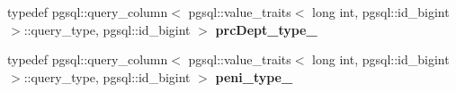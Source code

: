 \begin{DoxyCompactItemize}
\item 
typedef pgsql\+::query\+\_\+column$<$ pgsql\+::value\+\_\+traits$<$ long int, pgsql\+::id\+\_\+bigint $>$\+::query\+\_\+type, pgsql\+::id\+\_\+bigint $>$ {\bfseries prc\+Dept\+\_\+type\+\_\+}\hypertarget{structodb_1_1query__columns_3_01_1_1kpk_1_1data_1_1_loan_oper_00_01id__pgsql_00_01_a_01_4_1_1fact__class___a14ed1fbe0297b9c2cf99e91568973383}{}\label{structodb_1_1query__columns_3_01_1_1kpk_1_1data_1_1_loan_oper_00_01id__pgsql_00_01_a_01_4_1_1fact__class___a14ed1fbe0297b9c2cf99e91568973383}

\item 
typedef pgsql\+::query\+\_\+column$<$ pgsql\+::value\+\_\+traits$<$ long int, pgsql\+::id\+\_\+bigint $>$\+::query\+\_\+type, pgsql\+::id\+\_\+bigint $>$ {\bfseries peni\+\_\+type\+\_\+}\hypertarget{structodb_1_1query__columns_3_01_1_1kpk_1_1data_1_1_loan_oper_00_01id__pgsql_00_01_a_01_4_1_1fact__class___a73e43b8142ccdf0b2ed40fc949abddef}{}\label{structodb_1_1query__columns_3_01_1_1kpk_1_1data_1_1_loan_oper_00_01id__pgsql_00_01_a_01_4_1_1fact__class___a73e43b8142ccdf0b2ed40fc949abddef}

\end{DoxyCompactItemize}
